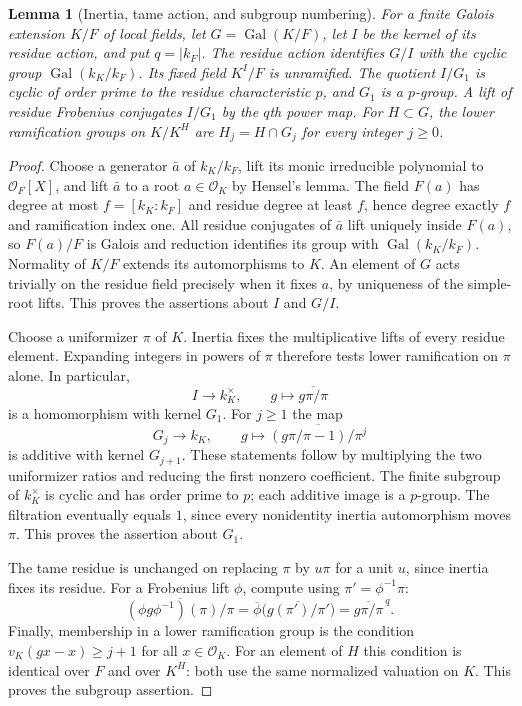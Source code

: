 \documentclass[11pt]{amsart}
\newtheorem{lemma}[theorem]{Lemma}
\theoremstyle{definition}
\theoremstyle{remark}
\newcommand{\Gal}{\operatorname{Gal}}
\newcommand{\OO}{\mathcal O}\newcommand{\pp}{\mathfrak p}\newcommand{\PP}{\mathfrak P}
\begin{document}
\begin{lemma}[Inertia, tame action, and subgroup numbering]\label{D:inertia}
For a finite Galois extension $K/F$ of local fields, let $G=\Gal(K/F)$,
let $I$ be the kernel of its residue action, and put $q=|k_F|$.
The residue action identifies $G/I$ with the cyclic group
$\Gal(k_K/k_F)$. Its fixed field $K^I/F$ is unramified.
The quotient $I/G_1$ is cyclic of order prime to the residue
characteristic $p$, and $G_1$ is a $p$-group.
A lift of residue Frobenius conjugates $I/G_1$ by the $q$th power map.
For $H\subset G$, the lower ramification groups on $K/K^H$ are
$H_j=H\cap G_j$ for every integer $j\ge0$.
\end{lemma}
\begin{proof}
Choose a generator $\bar a$ of $k_K/k_F$, lift its monic irreducible
polynomial to $\OO_F[X]$, and lift $\bar a$ to a root $a\in\OO_K$
by Hensel's lemma. The field $F(a)$ has degree at most
$f=[k_K:k_F]$ and residue degree at least $f$, hence degree exactly
$f$ and ramification index one. All residue conjugates of $\bar a$
lift uniquely inside $F(a)$, so $F(a)/F$ is Galois and reduction
identifies its group with $\Gal(k_K/k_F)$. Normality of $K/F$
extends its automorphisms to $K$. An element of $G$ acts trivially on
the residue field precisely when it fixes $a$, by uniqueness of the
simple-root lifts. This proves the assertions about $I$ and $G/I$.

Choose a uniformizer $\pi$ of $K$. Inertia fixes the multiplicative
lifts of every residue element. Expanding integers in powers of $\pi$
therefore tests lower ramification on $\pi$ alone. In particular,
\[
 I\longrightarrow k_K^\times,\qquad
 g\longmapsto\overline{g\pi/\pi}
\]
is a homomorphism with kernel $G_1$. For $j\ge1$ the map
\[
 G_j\longrightarrow k_K,\qquad
 g\longmapsto\overline{(g\pi/\pi-1)/\pi^j}
\]
is additive with kernel $G_{j+1}$. These statements follow by
multiplying the two uniformizer ratios and reducing the first
nonzero coefficient. The finite subgroup of $k_K^\times$ is cyclic
and has order prime to $p$; each additive image is a $p$-group.
The filtration eventually equals $1$, since every nonidentity inertia
automorphism moves $\pi$. This proves the assertion about $G_1$.

The tame residue is unchanged on replacing $\pi$ by $u\pi$ for a
unit $u$, since inertia fixes its residue. For a Frobenius lift $\phi$,
compute using $\pi'=\phi^{-1}\pi$:
\[
 \overline{(\phi g\phi^{-1})(\pi)/\pi}
   =\overline{\phi}\bigl(\overline{g(\pi')/\pi'}\bigr)
   =\overline{g\pi/\pi}^{\,q}.
\]
Finally, membership in a lower ramification group is the condition
$v_K(gx-x)\ge j+1$ for all $x\in\OO_K$. For an element of $H$
this condition is identical over $F$ and over $K^H$: both use the same
normalized valuation on $K$. This proves the subgroup assertion.
\end{proof}
\end{document}
